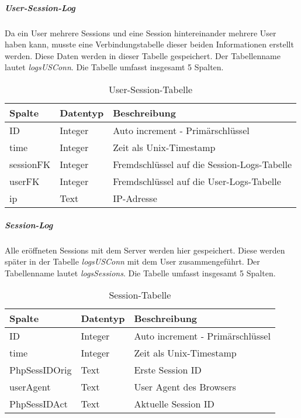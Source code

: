 \subparagraph{User-Session-Log\\}
Da ein User mehrere Sessions und eine Session hintereinander mehrere User haben kann, musste eine Verbindungstabelle dieser beiden Informationen erstellt werden. Diese Daten werden in dieser Tabelle gespeichert. Der Tabellenname lautet \textit{logsUSConn}. Die Tabelle umfasst insgesamt 5 Spalten.

\begin{table}[H]
\centering
\begin{tabular}{p{2.5 cm}p{2.5 cm}p{10 cm}}
   \toprule
   \textbf{Spalte} & \textbf{Datentyp} & \textbf{Beschreibung} \\
   \midrule
          ID & Integer & Auto increment - Primärschlüssel  \\
          \hline
          time & Integer & Zeit als Unix-Timestamp   \\
          \hline
	      sessionFK & Integer & Fremdschlüssel auf die Session-Logs-Tabelle   \\
	      \hline
          userFK & Integer & Fremdschlüssel auf die User-Logs-Tabelle   \\
          \hline
          ip & Text & IP-Adresse  \\
   \bottomrule
\end{tabular}
\caption{User-Session-Tabelle}
\end{table}

\subparagraph{Session-Log\\}
Alle eröffneten Sessions mit dem Server werden hier gespeichert. Diese werden später in der Tabelle \textit{logsUSConn} mit dem User zusammengeführt. Der Tabellenname lautet \textit{logsSessions}. Die Tabelle umfasst insgesamt 5 Spalten.

\begin{table}[H]
\centering
\begin{tabular}{p{2.5 cm}p{2.5 cm}p{10 cm}}
   \toprule
   \textbf{Spalte} & \textbf{Datentyp} & \textbf{Beschreibung} \\
   \midrule
          ID & Integer & Auto increment - Primärschlüssel  \\
          \hline
          time & Integer & Zeit als Unix-Timestamp   \\
          \hline
	      PhpSessIDOrig & Text & Erste Session ID   \\
	      \hline
          userAgent & Text & User Agent des Browsers   \\
          \hline
          PhpSessIDAct & Text & Aktuelle Session ID  \\
   \bottomrule
\end{tabular}
\caption{Session-Tabelle}
\end{table}

